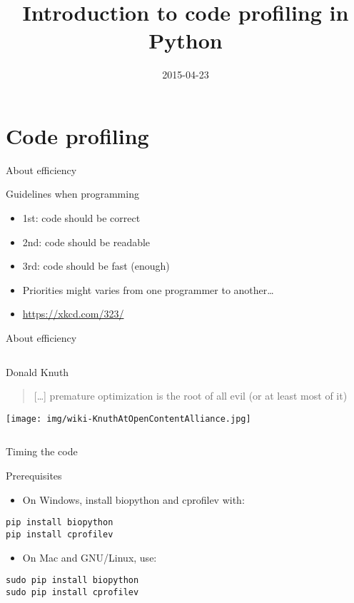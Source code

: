 \documentclass[big]{beamer}
\author{}
\date{2015-04-23}
\title{Introduction to code profiling in Python}
\begin{document}
\maketitle

\section{Code profiling}
\label{sec-1}

\begin{frame}[label=sec-1-1]{About efficiency}
\begin{block}{Guidelines when programming}
\begin{itemize}
\item 1st: code should be \alert{correct}
\item 2nd: code should be \alert{readable}
\item 3rd: code should be \alert{fast (enough)}
\end{itemize}
\end{block}
\begin{block}{}
\begin{itemize}
\item Priorities might varies from one programmer to another\ldots{}
\item \url{https://xkcd.com/323/}
\end{itemize}
\end{block}
\end{frame}
\begin{frame}[label=sec-1-2]{About efficiency}
\begin{columns}
\begin{column}{0.7\textwidth}
\begin{block}{Donald Knuth}
\begin{quote}
[\ldots{}] premature optimization is the root of all evil (or at least most of it)
\end{quote}

\texttt{[image: img/wiki-KnuthAtOpenContentAlliance.jpg]}
\end{block}
\end{column}
\end{columns}
\end{frame}
\begin{frame}[fragile,label=sec-1-3]{Timing the code}
 \begin{block}{Prerequisites}
\begin{itemize}
\item On Windows, install biopython and cprofilev with:
\end{itemize}
\begin{verbatim}
pip install biopython
pip install cprofilev
\end{verbatim}
\begin{itemize}
\item On Mac and GNU/Linux, use:
\end{itemize}
\begin{verbatim}
sudo pip install biopython
sudo pip install cprofilev
\end{verbatim}
\end{block}
\end{frame}
\end{document}
